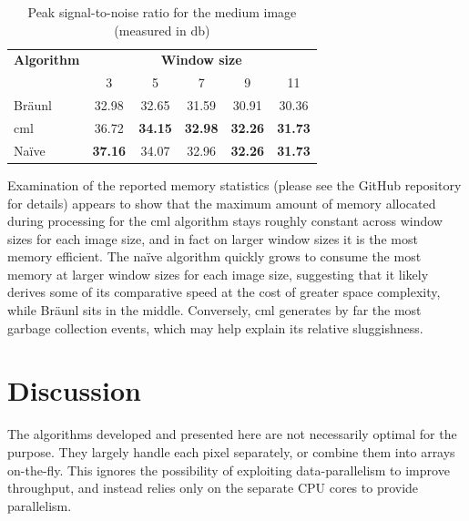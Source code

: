 \begin{table}
\centering
\caption[Peak signal-to-noise for the medium image]{Peak signal-to-noise ratio for the medium image (measured in \unit{\decibel})}
\begin{tabular}{@{}lccccc@{}}
\toprule
\multicolumn{1}{c}{\textbf{Algorithm}} & \multicolumn{5}{c}{\textbf{Window size}}                                           \\
                                       & 3              & 5              & 7              & 9              & 11             \\ \midrule
Bräunl                                 & 32.98          & 32.65          & 31.59          & 30.91          & 30.36          \\
\gls{cml}                                    & 36.72          & \textbf{34.15} & \textbf{32.98} & \textbf{32.26} & \textbf{31.73} \\
Naïve                                  & \textbf{37.16} & 34.07          & 32.96          & \textbf{32.26} & \textbf{31.73} \\ \bottomrule
\end{tabular}
\label{tab:median:psnrmedium}
\end{table}

Examination of the reported memory statistics (please see the GitHub repository for details) appears to show that the maximum amount of memory allocated during processing for the \gls{cml} algorithm stays roughly constant across window sizes for each image size, and in fact on larger window sizes it is the most memory efficient.  The naïve algorithm quickly grows to consume the most memory at larger window sizes for each image size, suggesting that it likely derives some of its comparative speed at the cost of greater space complexity, while Bräunl sits in the middle.  Conversely, \gls{cml} generates by far the most garbage collection events, which may help explain its relative sluggishness.

\section{Discussion}

The algorithms developed and presented here are not necessarily optimal for the purpose.  They largely handle each pixel separately, or combine them into arrays on-the-fly.  This ignores the possibility of exploiting data-parallelism to improve throughput, and instead relies only on the separate CPU cores to provide parallelism.

